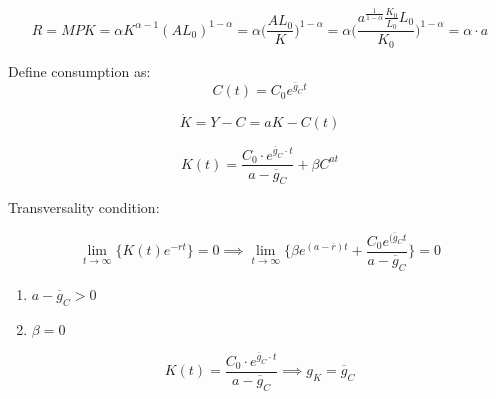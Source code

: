 \begin{equation*}
    R=MPK=\alpha K^{\alpha-1}(AL_{0})^{1-\alpha}=\alpha\bigg(\frac{AL_{0}}{K} \bigg)^{1-\alpha}=\alpha \bigg(\frac{a^{\frac{1}{1-\alpha}}\frac{K_{0}}{L_{0}}L_{0}}{K_{0}} \bigg)^{1-\alpha}=\alpha \cdot a
\end{equation*}

Define consumption as: 
\begin{equation*}
    C(t)=C_{0}e^{\overline{g}_{C}t}
\end{equation*}

\begin{equation*}
    \dot{K}=Y-C=aK-C(t)
\end{equation*}

\begin{equation*}
    K(t)=\frac{C_{0}\cdot e^{\overline{g}_{C}\cdot t}}{a-\overline{g}_{C}}+\beta C^{at}
\end{equation*}


Transversality condition:

\begin{equation*}
    \lim_{t \to \infty} \bigg \{K(t)e^{-rt} \bigg \}=0 \implies \lim_{t \to \infty} \bigg\{ \beta e^{(a-\overline{r})t}+\frac{C_{0}e^{(\overline{g}_{C}t}}{a-\overline{g}_{C}} \bigg\}=0
\end{equation*}

\begin{enumerate}
    \item $a-\overline{g}_{C}>0$
    \item $\beta = 0 $
\end{enumerate}

\begin{equation*}
    K(t)=\frac{C_{0}\cdot e^{\overline{g}_{C}\cdot t}}{a-\overline{g}_{C}} \implies g_{K}=\overline{g}_{C}
\end{equation*}








